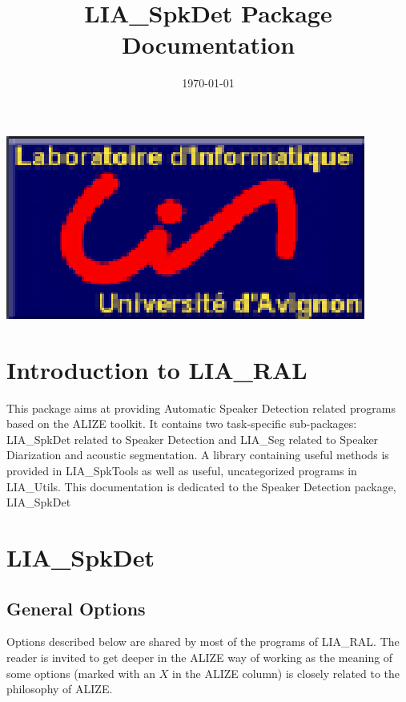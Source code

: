 \documentclass[a4paper]{article}
\date{\today}
\title{\Large\bf LIA\_SpkDet Package Documentation}
\begin{document}
\href{http://www.lia.univ-avignon.fr}{\includegraphics[scale=0.8]{lia.eps}}\\
\ninept
\maketitle
\section{Introduction to LIA\_RAL}

This package aims at providing Automatic Speaker Detection related
programs based on the ALIZE toolkit. It contains two task-specific
sub-packages: LIA\_SpkDet related to Speaker Detection and LIA\_Seg
related to Speaker Diarization and acoustic segmentation. A library
containing useful methods is provided in LIA\_SpkTools as well as
useful, uncategorized programs in LIA\_Utils. This documentation is
dedicated to the Speaker Detection package, LIA\_SpkDet
\section{LIA\_SpkDet}
\label{sec:SpkDet}

\subsection{General Options}

Options described below are shared by most of the programs of LIA\_RAL.
The reader is invited to get deeper in the ALIZE way of working as the meaning of some options (marked with an $X$ in the ALIZE column) is closely related to the philosophy of ALIZE.
\end{document}
